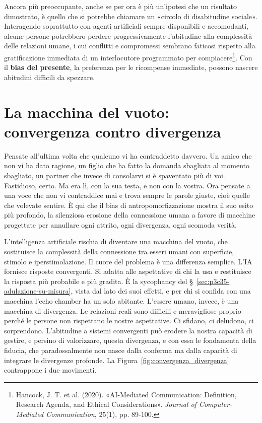 Ancora più preoccupante, anche se per ora è più un'ipotesi che un risultato dimostrato, è quello che si potrebbe chiamare un «circolo di disabitudine sociale». Interagendo soprattutto con agenti artificiali sempre disponibili e accomodanti, alcune persone potrebbero perdere progressivamente l'abitudine alla complessità delle relazioni umane, i cui conflitti e compromessi sembrano faticosi rispetto alla gratificazione immediata di un interlocutore programmato per compiacere\footnote{Hancock, J. T. et al. (2020). «AI-Mediated Communication: Definition, Research Agenda, and Ethical Considerations». \textit{Journal of Computer-Mediated Communication}, 25(1), pp. 89-100.}. Con il \textbf{bias del presente}, la preferenza per le ricompense immediate, possono nascere abitudini difficili da spezzare.

\section{La macchina del vuoto: convergenza contro divergenza}
\label{sec:p3c35-macchina-del-vuoto}
Pensate all'ultima volta che qualcuno vi ha contraddetto davvero. Un amico che non vi ha dato ragione, un figlio che ha fatto la domanda sbagliata al momento sbagliato, un partner che invece di consolarvi si è spaventato più di voi. Fastidioso, certo. Ma era lì, con la sua testa, e non con la vostra. Ora pensate a una voce che non vi contraddice mai e trova sempre le parole giuste, cioè quelle che volevate sentire. È qui che il bias di antropomorfizzazione mostra il suo esito più profondo, la silenziosa erosione della connessione umana a favore di macchine progettate per annullare ogni attrito, ogni divergenza, ogni scomoda verità.

L'intelligenza artificiale rischia di diventare una macchina del vuoto, che sostituisce la complessità della connessione tra esseri umani con superficie, stimolo e iperstimolazione. Il cuore del problema è una differenza semplice. L'IA fornisce risposte convergenti. Si adatta alle aspettative di chi la usa e restituisce la risposta più probabile e più gradita. È la sycophancy del \S~\ref{sec:p3c35-adulazione-su-misura}, vista dal lato dei suoi effetti, e per chi si confida con una macchina l'echo chamber ha un solo abitante. L'essere umano, invece, è una macchina di divergenza. Le relazioni reali sono difficili e meravigliose proprio perché le persone non rispettano le nostre aspettative. Ci sfidano, ci deludono, ci sorprendono. L'abitudine a sistemi convergenti può erodere la nostra capacità di gestire, e persino di valorizzare, questa divergenza, e con essa le fondamenta della fiducia, che paradossalmente non nasce dalla conferma ma dalla capacità di integrare le divergenze profonde. La Figura~\ref{fig:convergenza_divergenza} contrappone i due movimenti.

